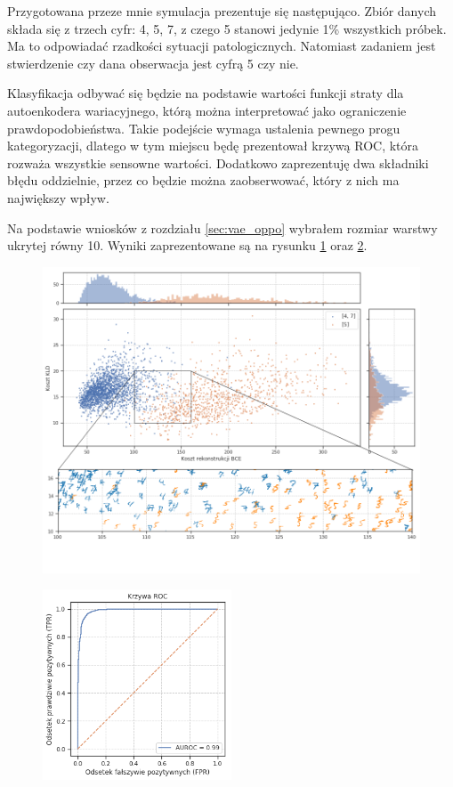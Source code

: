 Przygotowana przeze mnie symulacja prezentuje się następująco. Zbiór danych składa się z trzech cyfr: 4, 5, 7, z czego 5 stanowi jedynie 1\% wszystkich próbek. Ma to odpowiadać rzadkości sytuacji patologicznych. Natomiast zadaniem jest stwierdzenie czy dana obserwacja jest cyfrą 5 czy nie.

Klasyfikacja odbywać się będzie na podstawie wartości funkcji straty dla autoenkodera wariacyjnego, którą można interpretować jako ograniczenie prawdopodobieństwa. Takie podejście wymaga ustalenia pewnego progu kategoryzacji, dlatego w tym miejscu będę prezentował krzywą ROC, która rozważa wszystkie sensowne wartości. Dodatkowo zaprezentuję dwa składniki błędu oddzielnie, przez co będzie można zaobserwować, który z nich ma największy wpływ.

Na podstawie wniosków z rozdziału \ref{sec:vae_oppo} wybrałem rozmiar warstwy ukrytej równy 10. Wyniki zaprezentowane są na rysunku \ref{fig:mnist_compare} oraz \ref{fig:mnist_roc}.

\begin{figure}[h!]
    \centering
    \includegraphics[width=1.0\textwidth]{images/mnist_complex}
    \caption{}
    \label{fig:mnist_compare}
\end{figure}

\begin{figure}[h!]
    \centering
    \includegraphics[width=0.5\textwidth]{images/mnist_roc_v2}
    \caption{}
    \label{fig:mnist_roc}
\end{figure}

